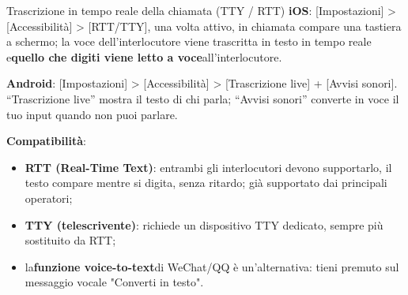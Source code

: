 \begin{tcbinfo}{Trascrizione in tempo reale della chiamata (TTY / RTT)}
\textbf{iOS}: [Impostazioni] > [Accessibilità] > [RTT/TTY], una volta attivo, in chiamata compare una tastiera a schermo; la voce dell'interlocutore viene trascritta in testo in tempo reale e\textbf{quello che digiti viene letto a voce}all'interlocutore.

\textbf{Android}: [Impostazioni] > [Accessibilità] > [Trascrizione live] + [Avvisi sonori]. “Trascrizione live” mostra il testo di chi parla; “Avvisi sonori” converte in voce il tuo input quando non puoi parlare.

\textbf{Compatibilità}:

\begin{itemize}
  \item \textbf{RTT (Real-Time Text)}: entrambi gli interlocutori devono supportarlo, il testo compare mentre si digita, senza ritardo; già supportato dai principali operatori;
  \item \textbf{TTY (telescrivente)}: richiede un dispositivo TTY dedicato, sempre più sostituito da RTT;
  \item la\textbf{funzione voice-to-text}di WeChat/QQ è un'alternativa: tieni premuto sul messaggio vocale "Converti in testo".
\end{itemize}

\end{tcbinfo}


